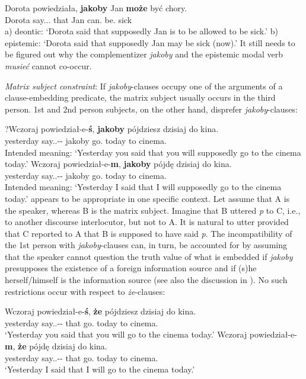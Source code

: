 \documentclass[output=paper
,modfonts
,nonflat]{langsci/langscibook}
\begin{document}
\ea \gll Dorota powiedziała, \textbf{jakoby} Jan \textbf{może} być chory. \\
		Dorota say.{\lptcp}.{\sg}.{\fem} that Jan can.{\thirdperson}{\sg} be.{\infv} sick \\
\glt	a) deontic: `Dorota said that supposedly Jan is to be allowed to be sick.' \newline
\glt	b) epistemic: `Dorota said that supposedly Jan may be sick (now).'
\z
It still needs to be figured out why the complementizer \emph{jakoby} and the epistemic modal verb \emph{musieć} cannot co-occur.

\emph{Matrix subject constraint}: If \emph{jakoby}-clauses occupy one of the arguments of a clause-embedding predicate, the matrix subject usually occurs in the third person. 1st and 2nd person subjects, on the other hand, disprefer \emph{jakoby}-clauses:

\ea \ea \gll	?Wczoraj powiedział-e-\textbf{ś}, \textbf{jakoby} pójdziesz dzisiaj do kina. \label{drugaosoba} \\
  			yesterday say.{\lptcp}.{\sg}-{\masc}-{\secondperson}{\sg} jakoby go.{\secondperson}{\sg} today to cinema.{\gen} \\
	\glt		Intended meaning: `Yesterday you said that  you will supposedly go to the cinema today.'
		\ex \gll	*Wczoraj powiedział-e-\textbf{m}, \textbf{jakoby} pójdę dzisiaj do kina. \label{pierwszy} \\
  			yesterday say.{\lptcp}.{\sg}-{\masc}-{\firstperson}{\sg} jakoby go.{\firstperson}{\sg} today to cinema.{\gen}\\
	\glt		Intended meaning: `Yesterday I said that I will supposedly go to the cinema today.'
\z\z
{} appears to be appropriate in one specific context. Let assume that A is the speaker, whereas B is the matrix subject. Imagine that B uttered \emph{p} to C, i.e., to another discourse interlocutor, but not to A. It is natural to utter  provided that C reported to A that B is supposed to have said \emph{p}. The incompatibility of the 1st person with \emph{jakoby}-clauses can, in turn, be accounted for by assuming that the speaker cannot question the truth value of what is embedded if \emph{jakoby} presupposes the existence of a foreign information source and if (s)he herself\slash himself is the information source (see also the discussion in \cite{Curnow2002}). No such restrictions occur with respect to \emph{że}-clauses:

 \ea \ea \gll Wczoraj powiedział-e-\textbf{ś}, \textbf{że} pójdziesz dzisiaj do kina. \\
  			yesterday say.{\lptcp}.{\sg}-{\masc}-{\secondperson}{\sg} that go.{\secondperson}{\sg} today to cinema.{\gen} \\
	\glt		`Yesterday you said that you will go to the cinema today.'
	\ex \gll Wczoraj powiedział-e-\textbf{m}, \textbf{że} pójdę dzisiaj do kina. \\
  			yesterday say.{\lptcp}.{\sg}-{\masc}-{\firstperson}{\sg} that go.{\firstperson}{\sg} today to cinema.{\gen} \\
    \glt `Yesterday I said that I will go to the cinema today.'      
\z
\z
\end{document}
